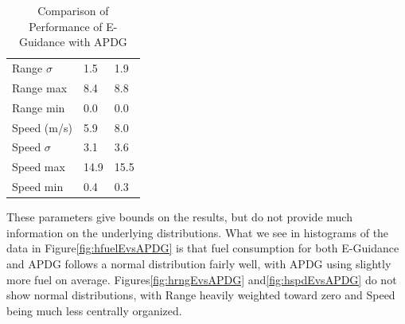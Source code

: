 \begin{table}[H]
\begin{tabularx}{\textwidth}{@{}lYY@{}}
	Range $\sigma$ & 1.5 & 1.9 \\                              

	Range max & 8.4 & 8.8 \\                                   

	Range min & 0.0 & 0.0 \\                                   
	\toprule
	Speed (m/s) & 5.9 & 8.0 \\                                 

	Speed $\sigma$ & 3.1 & 3.6 \\                              

	Speed max & 14.9 & 15.5 \\                                 

	Speed min & 0.4 & 0.3 \\                                   
	\bottomrule
\end{tabularx}                                              
\caption{Comparison of Performance of E-Guidance with APDG}
\label{tab:EvsAPDG}                                        
\end{table}   

These parameters give bounds on the results, but do not provide much information on the underlying distributions. What we see in histograms of the data in Figure\:\ref{fig:hfuelEvsAPDG} is that fuel consumption for both E-Guidance and APDG follows a normal distribution fairly well, with APDG using slightly more fuel on average. Figures\:\ref{fig:hrngEvsAPDG} and\:\ref{fig:hspdEvsAPDG} do not show normal distributions, with Range heavily weighted toward zero and Speed being much less centrally organized.

